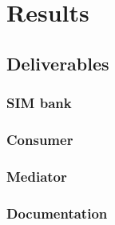\chapter{Results}

\section{Deliverables}

\subsection{SIM bank}

\subsection{Consumer}

\subsection{Mediator}

\subsection{Documentation}
